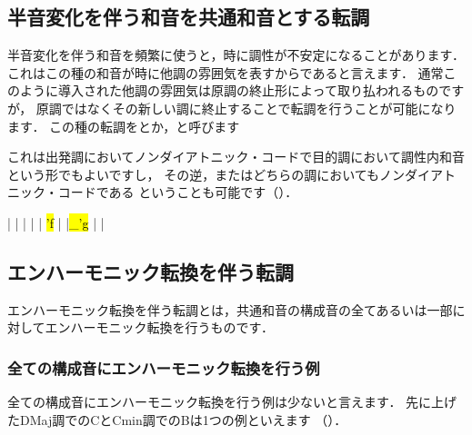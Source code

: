 \documentclass[dvipdfmx,uplatex,b5paper,openany,jbase=12Q,nomag*,textwidth-limit=44%
               ]{gachimuchi}
\begin{document}
\subsection{半音変化を伴う和音を共通和音とする転調}
半音変化を伴う和音を頻繁に使うと，時に調性が不安定になることがあります．
これはこの種の和音が時に他調の雰囲気を表すからであると言えます．
通常このように導入された他調の雰囲気は原調の終止形によって取り払われるものですが，
原調ではなくその新しい調に終止することで転調を行うことが可能になります．
この種の転調をとか，と呼びます

これは出発調においてノンダイアトニック・コードで目的調において調性内和音という形でもよいですし，
その逆，またはどちらの調においてもノンダイアトニック・コードである
ということも可能です（）．
\begin{floatMusic}[pos=ht]
  \generalmeter{\meterC}%
  \Startpiece
  \NOTes%
  |%
  \en\bar%
  \NOTes%
  |%
  \en\bar%
  \NOTes%
  \zchordsl{\Gnii\Min}%
  |%
  \hl{'f}%
  \en\bar\addspace{.3\afterruleskip}%
  \NOTes%
  |\hl{_'g}%
  \en\bar\addspace{.3\afterruleskip}%
  \NOTEs%
  |%
  \en\setdoublebar%
  \endpiece
\end{floatMusic}


\subsection{エンハーモニック転換を伴う転調}
エンハーモニック転換を伴う転調とは，共通和音の構成音の全てあるいは一部に対してエンハーモニック転換を行うものです．
\subsubsection{全ての構成音にエンハーモニック転換を行う例}
全ての構成音にエンハーモニック転換を行う例は少ないと言えます．
先に上げたD\aFlat Maj調でのC\Dimt とC\aSharp min調でのB\aSharp\Dimt は1つの例といえます
（）．
\end{document}
